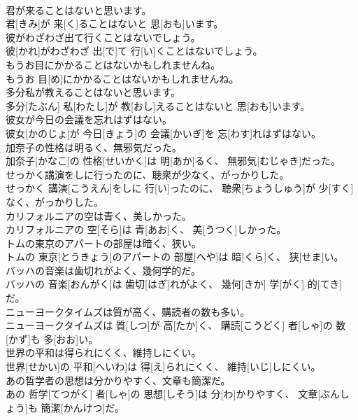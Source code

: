 \documentclass[8pt]{extreport}
\begin{document}
\begin{CJK}{UTF8}{min}
\\	君が来ることはないと思います。	
\\	君[きみ]が 来[く]ることはないと 思[おも]います。
\\	彼がわざわざ出て行くことはないでしょう。	
\\	彼[かれ]がわざわざ 出[で]て 行[い]くことはないでしょう。
\\	もうお目にかかることはないかもしれませんね。	
\\	もうお 目[め]にかかることはないかもしれませんね。
\\	多分私が教えることはないと思います。	
\\	多分[たぶん] 私[わたし]が 教[おし]えることはないと 思[おも]います。
\\	彼女が今日の会議を忘れはずはない。	
\\	彼女[かのじょ]が 今日[きょう]の 会議[かいぎ]を 忘[わす]れはずはない。
\\	加奈子の性格は明るく、無邪気だった。	
\\	加奈子[かなこ]の 性格[せいかく]は 明[あか]るく、 無邪気[むじゃき]だった。
\\	せっかく講演をしに行ったのに、聴衆が少なく、がっかりした。	
\\	せっかく 講演[こうえん]をしに 行[い]ったのに、 聴衆[ちょうしゅう]が 少[すく]なく、がっかりした。
\\	カリフォルニアの空は青く、美しかった。	
\\	カリフォルニアの 空[そら]は 青[あお]く、 美[うつく]しかった。
\\	トムの東京のアパートの部屋は暗く、狭い。	
\\	トムの 東京[とうきょう]のアパートの 部屋[へや]は 暗[くら]く、 狭[せま]い。
\\	バッハの音楽は歯切れがよく、幾何学的だ。	
\\	バッハの 音楽[おんがく]は 歯切[はぎ]れがよく、 幾何[きか] 学[がく] 的[てき]だ。
\\	ニューヨークタイムズは質が高く、購読者の数も多い。	
\\	ニューヨークタイムズは 質[しつ]が 高[たか]く、 購読[こうどく] 者[しゃ]の 数[かず]も 多[おお]い。
\\	世界の平和は得られにくく、維持しにくい。	
\\	世界[せかい]の 平和[へいわ]は 得[え]られにくく、 維持[いじ]しにくい。
\\	あの哲学者の思想は分かりやすく、文章も簡潔だ。	
\\	あの 哲学[てつがく] 者[しゃ]の 思想[しそう]は 分[わ]かりやすく、 文章[ぶんしょう]も 簡潔[かんけつ]だ。

\end{CJK}
\end{document}
